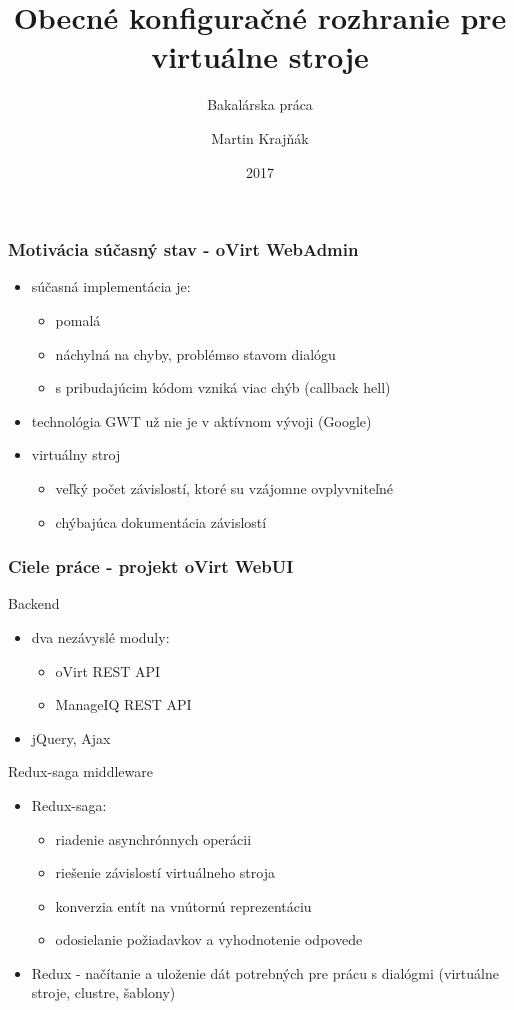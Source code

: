 \documentclass[pdf]{beamer}
\title{Obecné konfiguračné rozhranie pre virtuálne stroje}
\subtitle{Bakalárska práca}
\author{Martin Krajňák}
\date{2017}
\begin{document}
\begin{frame}
\titlepage
\end{frame}


\begin{frame}
\frametitle{Motivácia súčasný stav - oVirt WebAdmin}
\begin{itemize}
\item súčasná implementácia je:
\begin{itemize}
\item pomalá
\item náchylná na chyby, problémso stavom dialógu
\item s pribudajúcim kódom vzniká viac chýb (callback hell)
\end{itemize}
\item technológia GWT už nie je v aktívnom vývoji (Google)
\item virtuálny stroj 
\begin{itemize}
\item veľký počet závislostí, ktoré su vzájomne ovplyvniteľné
\item chýbajúca dokumentácia závislostí
\end{itemize}
\end{itemize}
\end{frame}


\begin{frame}
\frametitle{Ciele práce - projekt oVirt WebUI}
\begin{block}{Backend}

\begin{itemize}
\item dva nezávyslé moduly:

\begin{itemize}
\item oVirt REST API
\item ManageIQ REST API
\end{itemize}

\item jQuery, Ajax
\end{itemize}

\end{block}

\begin{block}{Redux-saga middleware}
\begin{itemize}
\item Redux-saga:
\begin{itemize}
\item riadenie asynchrónnych operácii
\item riešenie závislostí virtuálneho stroja
\item konverzia entít na vnútornú reprezentáciu
\item odosielanie požiadavkov a vyhodnotenie odpovede
\end{itemize}
\item Redux - načítanie a uloženie dát potrebných pre prácu s dialógmi (virtuálne stroje, clustre, šablony)
\end{itemize}
\end{block}

\end{frame}
\end{document}
